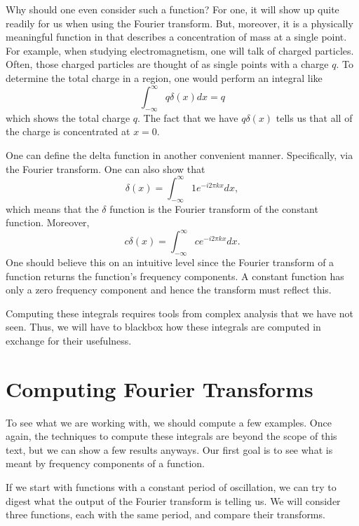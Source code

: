 Why should one even consider such a function? For one, it will show up quite readily for us when using the Fourier transform. But, moreover, it is a physically meaningful function in that describes a concentration of mass at a single point.  For example, when studying electromagnetism, one will talk of charged particles. Often, those charged particles are thought of as single points with a charge $q$.  To determine the total charge in a region, one would perform an integral like
\[
\int_{-\infty}^\infty q\delta(x)dx = q
\]
which shows the total charge $q$. The fact that we have $q\delta(x)$ tells us that all of the charge is concentrated at $x=0$.  

One can define the delta function in another convenient manner.  Specifically, via the Fourier transform. One can also show that 
\[
\delta(x) = \int_{-\infty}^\infty 1 e^{-i2\pi kx}dx, 
\]
which means that the $\delta$ function is the Fourier transform of the constant function.  Moreover,
\[
c\delta(x) = \int_{-\infty}^\infty c e^{-i2\pi kx}dx.
\]
One should believe this on an intuitive level since the Fourier transform of a function returns the function's frequency components. A constant function has only a zero frequency component and hence the transform must reflect this.  

\begin{remark}
	Computing these integrals requires tools from complex analysis that we have not seen.  Thus, we will have to blackbox how these integrals are computed in exchange for their usefulness.
\end{remark}

\section{Computing Fourier Transforms}

To see what we are working with, we should compute a few examples. Once again, the techniques to compute these integrals are beyond the scope of this text, but we can show a few results anyways. Our first goal is to see what is meant by frequency components of a function.

If we start with functions with a constant period of oscillation, we can try to digest what the output of the Fourier transform is telling us. We will consider three functions, each with the same period, and compare their transforms.

